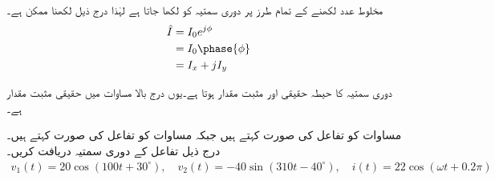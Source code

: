 مخلوط عدد لکھنے کے تمام طرز پر دوری سمتیہ کو لکھا جاتا ہے لہٰذا درج ذیل لکھنا ممکن ہے۔
\begin{gather}
\begin{aligned}\label{مساوات_بدلتا_تعددی_طرز}
\hat{I}&=I_0e^{j\phi}\\
 &=I_0\phase{\phi}\\
&=I_x+jI_y
\end{aligned}
\end{gather}

دوری سمتیہ کا حیطہ حقیقی اور مثبت مقدار ہوتا ہے۔یوں درج بالا مساوات میں  حقیقی مثبت مقدار ہے۔

مساوات  کو تفاعل کی  صورت کہتے ہیں جبکہ مساوات  کو تفاعل کی  صورت کہتے ہیں۔
درج ذیل تفاعل کے دوری سمتیہ دریافت کریں۔
\begin{align*}
v_1(t)=20 \cos (100t +30^{\circ}), \quad v_2(t)=-40 \sin(310t -40^{\circ}), \quad i(t)=22\cos(\omega t+0.2\pi)
\end{align*}

